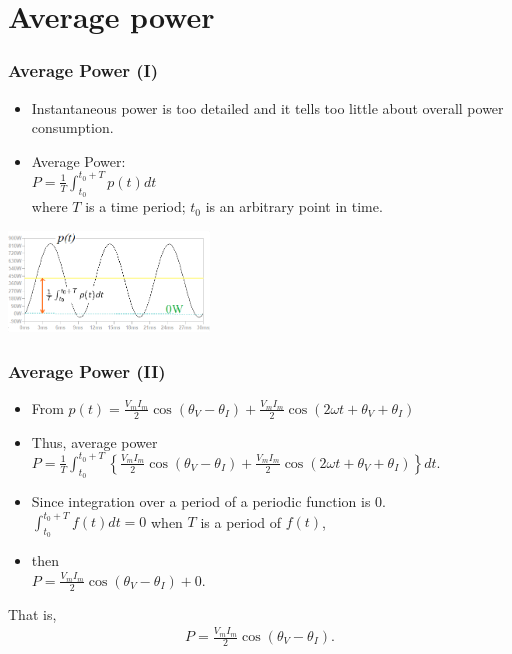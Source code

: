 \documentclass{beamer}
\begin{document}

\section{Average power}

\begin{frame}[fragile]
\frametitle{Average Power (I)}

\begin{itemize}
\item Instantaneous power is too detailed and it tells too little about overall power consumption.
\item Average Power:
\\
$P = \frac{1}{T}\int_{t_0}^{t_0+T} p(t) dt$
\\
where $T$ is a time period; $t_0$ is an arbitrary point in time.
\end{itemize}

\begin{center}
\includegraphics[width=0.4\textwidth]{src/FigAveragePower.png}
\end{center}

\end{frame}



\begin{frame}[fragile]
\frametitle{Average Power (II)}

\begin{itemize}
\item From $p(t) = \frac{V_m I_m}{2} \cos(\theta_V - \theta_I) + \frac{V_m I_m}{2} \cos(2 \omega t + \theta_V + \theta_I)$
\item Thus, average power
\\
$P = \frac{1}{T}\int_{t_0}^{t_0+T} \left\{ \frac{V_m I_m}{2} \cos(\theta_V - \theta_I) + \frac{V_m I_m}{2} \cos(2 \omega t + \theta_V + \theta_I) \right\} dt$.
\item Since integration over a period of a periodic function is $0$.
\\
$\int_{t_0}^{t_0+T} f(t) dt = 0$
when $T$ is a period of $f(t)$,
\item then
\\
$P = \frac{V_m I_m}{2} \cos(\theta_V - \theta_I) + 0$.
\end{itemize}

That is,
\begin{eqnarray}
P = \frac{V_m I_m}{2} \cos(\theta_V - \theta_I)
\label{eq: average power}.
\end{eqnarray}


\end{frame}
\end{document}
